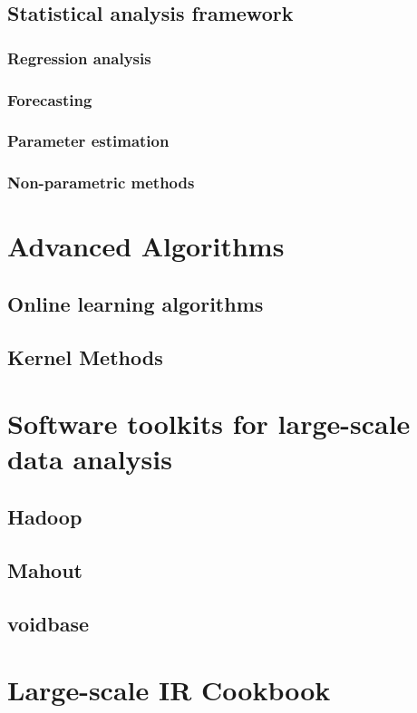 \documentclass[]{book}    %
\begin{document}
\section{Statistical analysis framework}
\subsection{Regression analysis}
\subsection{Forecasting}
\subsection{Parameter estimation}
\subsection{Non-parametric methods}

\chapter{Advanced Algorithms}
\section{Online learning algorithms}
\section{Kernel Methods}

\chapter{Software toolkits for large-scale data analysis}
\section{Hadoop}
\section{Mahout}
\section{voidbase}

\chapter{Large-scale IR Cookbook}
\end{document}
